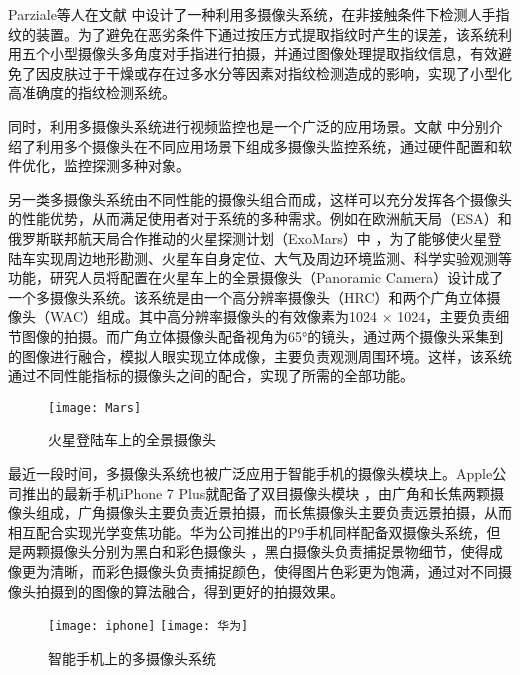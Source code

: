 Parziale等人在文献 \cite{parziale2006surround} 中设计了一种利用多摄像头系统，在非接触条件下检测人手指纹的装置。为了避免在恶劣条件下通过按压方式提取指纹时产生的误差，该系统利用五个小型摄像头多角度对手指进行拍摄，并通过图像处理提取指纹信息，有效避免了因皮肤过于干燥或存在过多水分等因素对指纹检测造成的影响，实现了小型化高准确度的指纹检测系统。

同时，利用多摄像头系统进行视频监控也是一个广泛的应用场景。文献 \cite{taj2009multi, bellotto2009distributed, fiore2008multi, kettnaker1999bayesian} 中分别介绍了利用多个摄像头在不同应用场景下组成多摄像头监控系统，通过硬件配置和软件优化，监控探测多种对象。

另一类多摄像头系统由不同性能的摄像头组合而成，这样可以充分发挥各个摄像头的性能优势，从而满足使用者对于系统的多种需求。例如在欧洲航天局（ESA）和俄罗斯联邦航天局合作推动的火星探测计划（ExoMars）中 \cite{9, 10}，为了能够使火星登陆车实现周边地形勘测、火星车自身定位、大气及周边环境监测、科学实验观测等功能，研究人员将配置在火星车上的全景摄像头（Panoramic Camera）设计成了一个多摄像头系统。该系统是由一个高分辨率摄像头（HRC）和两个广角立体摄像头（WAC）组成。其中高分辨率摄像头的有效像素为1024 × 1024，主要负责细节图像的拍摄。而广角立体摄像头配备视角为65°的镜头，通过两个摄像头采集到的图像进行融合，模拟人眼实现立体成像，主要负责观测周围环境。这样，该系统通过不同性能指标的摄像头之间的配合，实现了所需的全部功能。

\begin{figure}[H] 
  \centering
  \texttt{[image: Mars]}
  \caption{火星登陆车上的全景摄像头}
  \label{Mars}
\end{figure}

最近一段时间，多摄像头系统也被广泛应用于智能手机的摄像头模块上。Apple公司推出的最新手机iPhone 7 Plus就配备了双目摄像头模块 \cite{iphone}，由广角和长焦两颗摄像头组成，广角摄像头主要负责近景拍摄，而长焦摄像头主要负责远景拍摄，从而相互配合实现光学变焦功能。华为公司推出的P9手机同样配备双摄像头系统，但是两颗摄像头分别为黑白和彩色摄像头 \cite{华为}，黑白摄像头负责捕捉景物细节，使得成像更为清晰，而彩色摄像头负责捕捉颜色，使得图片色彩更为饱满，通过对不同摄像头拍摄到的图像的算法融合，得到更好的拍摄效果。

\begin{figure}[h]
  \centering%
    {\texttt{[image: iphone]}}
    \hspace{4em}%
      {\texttt{[image: 华为]}}
  \caption{智能手机上的多摄像头系统}
\end{figure}

